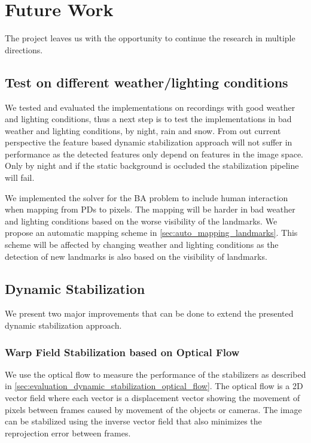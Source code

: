 
\section{Future Work}
The project leaves us with the opportunity to continue the research in multiple directions.

\subsection{Test on different weather/lighting conditions}
We tested and evaluated the implementations on recordings with good weather and lighting conditions, thus a next step is to test the implementations in bad weather and lighting conditions, \eg by night, rain and snow.
From out current perspective the feature based dynamic stabilization approach will not suffer in performance as the detected features only depend on features in the image space. 
Only by night and if the static background is occluded the stabilization pipeline will fail.

We implemented the solver for the BA problem to include human interaction when mapping from PDs to pixels.
The mapping will be harder in bad weather and lighting conditions based on the worse visibility of the landmarks.
We propose an automatic mapping scheme in \autoref{sec:auto_mapping_landmarks}.
This scheme will be affected by changing weather and lighting conditions as the detection of new landmarks is also based on the visibility of landmarks.


\subsection{Dynamic Stabilization}
We present two major improvements that can be done to extend the presented dynamic stabilization approach.

\subsubsection{Warp Field Stabilization based on Optical Flow}
We use the optical flow to measure the performance of the stabilizers as described in  \autoref{sec:evaluation_dynamic_stabilization_optical_flow}.
The optical flow is a 2D vector field where each vector is a displacement vector showing the movement of pixels between frames caused by movement of the objects or cameras.
The image can be stabilized using the inverse vector field that also minimizes the reprojection error between frames.

